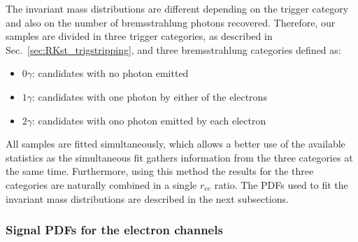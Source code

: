 The invariant mass distributions are different depending on the
trigger category and also on the number of bremsstrahlung photons recovered.
Therefore, our samples are divided in three trigger categories, as described in
Sec.~\ref{sec:RKst_trigstripping}, and three bremsstrahlung categories defined as:
%
\begin{itemize}
\item $0\gamma$: candidates with no photon emitted
\item $1\gamma$: candidates with one photon by either of the electrons
\item $2\gamma$: candidates with ono photon emitted by each electron
\end{itemize}
%
All samples are fitted simultaneously, which allows a better use of the available statistics 
as the simultaneous fit gathers information from the three categories at the same time.
Furthermore, using this method the results for the three categories are
naturally combined in a single $r_{ee}$ ratio.
%
The PDFs used to fit the invariant mass distributions are described in the next subsections.



\subsubsection{Signal PDFs for the electron channels}
\label{sec:fit_ee_central}


